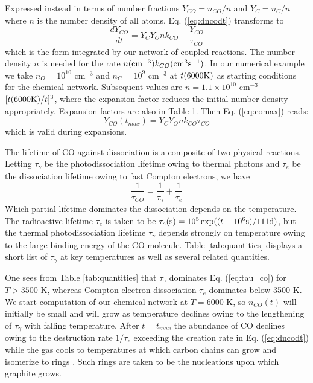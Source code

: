 \documentclass[manuscript]{aastex}
\begin{document}
Expressed instead in terms of number fractions $Y_{CO} = n_{CO} / n$
and $Y_C = n_C / n$ where $n$ is the number density of all atoms,
Eq. (\ref{eq:dncodt}) transforms to 
\begin{equation}
\frac{dY_{CO}}{dt} = Y_C Y_O n k_{CO} - \frac{Y_{CO}}{\tau_{CO}}	
\label{eq:dycodt}
\end{equation}
which is the form integrated by our network of coupled reactions.
The number density $n$ is needed for the rate
$n({\rm cm}^{-3}) k_{CO}({\rm cm}^3{\rm s}^{-1})$.
In our numerical example we take $n_O = 10^{10}$ cm$^{-3}$ and
$n_C = 10^9$ cm$^{-3}$ at $t(6000 {\rm K})$ as starting conditions for the
chemical network. Subsequent values are $n = 1.1 \times 10^{10}$ cm$^{-3}$
$[t(6000 {\rm K})/t]^3$, where the expansion factor reduces the initial number
density appropriately. Expansion factors are also in Table 1. Then
Eq. (\ref{eq:comax}) reads:
\begin{equation}
Y_{CO}(t_{max}) = Y_C Y_O n k_{CO} \tau_{CO}
\label{eq:ycomax}
\end{equation}
which is valid during expansions.

The lifetime of CO against dissociation is a composite of two physical
reactions. Letting $\tau_\gamma$ be the photodissociation lifetime owing
to thermal photons and $\tau_e$ be the dissociation lifetime owing to fast
Compton electrons, we have
\begin{equation}
\frac{1}{\tau_{CO}} = \frac{1}{\tau_\gamma} + \frac{1}{\tau_e}
\label{eq:tau_co}
\end{equation}
Which partial lifetime dominates the dissociation depends on the temperature.
The radioactive lifetime $\tau_e$ is taken to be
$\tau_e ({\rm s}) = 10^5 \exp( ( t -10^6{\rm s}) / 111 {\rm d} )$,
but the thermal photodissociation lifetime $\tau_\gamma$
depends strongly on temperature
owing to the large binding energy of the CO molecule.
Table \ref{tab:quantities} displays a
short list of $\tau_\gamma$ at key temperatures as well as several related
quantities.

One sees from Table \ref{tab:quantities}
that $\tau_\gamma$ dominates Eq. (\ref{eq:tau_co}) for $T > 3500$ K,
whereas Compton
electron dissociation $\tau_e$
dominates below 3500 K. We start computation of our
chemical network at $T = 6000$ K,
so $n_{CO}(t)$ will initially be small and will
grow as temperature declines owing to the lengthening of $\tau_\gamma$ with
falling temperature. After $t=t_{max}$ the abundance of CO declines owing to
the destruction rate $1/\tau_e$ exceeding the creation rate in
Eq. (\ref{eq:dncodt})
while the gas cools to temperatures at which carbon chains can grow and
isomerize to rings \citep{1999Sci...283.1290C}. Such rings are taken to be
the nucleations upon which graphite grows.
\end{document}
